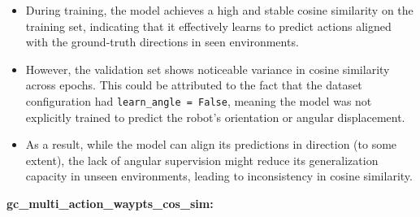 \documentclass[12pt]{article}
\begin{document}
\begin{itemize}
    \item During training, the model achieves a high and stable cosine similarity on the training set, indicating that it effectively learns to predict actions aligned with the ground-truth directions in seen environments.
    \item However, the validation set shows noticeable variance in cosine similarity across epochs. This could be attributed to the fact that the dataset configuration had \texttt{learn\_angle = False}, meaning the model was not explicitly trained to predict the robot's orientation or angular displacement.
    \item As a result, while the model can align its predictions in direction (to some extent), the lack of angular supervision might reduce its generalization capacity in unseen environments, leading to inconsistency in cosine similarity.
\end{itemize}
\noindent \textbf{gc\_multi\_action\_waypts\_cos\_sim:}\\
\end{document}
